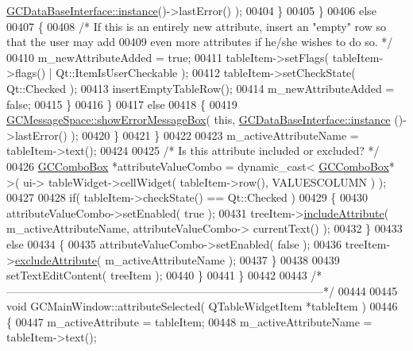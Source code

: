 \begin{DoxyCode}
{      \hyperlink{class_g_c_data_base_interface_a1baea9c0667aa8b610ec30076fcab84c}{GCDataBaseInterface::instance}()->lastError() );
00404           \}
00405         \}
00406         \textcolor{keywordflow}{else}
00407         \{
00408           \textcolor{comment}{/* If this is an entirely new attribute, insert an "empty" row so
       that the user may add}
00409 \textcolor{comment}{            even more attributes if he/she wishes to do so. */}
00410           m\_newAttributeAdded = \textcolor{keyword}{true};
00411           tableItem->setFlags( tableItem->flags() | Qt::ItemIsUserCheckable );
00412           tableItem->setCheckState( Qt::Checked );
00413           insertEmptyTableRow();
00414           m\_newAttributeAdded = \textcolor{keyword}{false};
00415         \}
00416       \}
00417       \textcolor{keywordflow}{else}
00418       \{
00419         \hyperlink{namespace_g_c_message_space_ab118b3a133686167617eb955029fd44e}{GCMessageSpace::showErrorMessageBox}( \textcolor{keyword}{this}, \hyperlink{class_g_c_data_base_interface_a1baea9c0667aa8b610ec30076fcab84c}{GCDataBaseInterface::instance}
      ()->lastError() );
00420       \}
00421     \}
00422 
00423     m\_activeAttributeName = tableItem->text();
00424 
00425     \textcolor{comment}{/* Is this attribute included or excluded? */}
00426     \hyperlink{class_g_c_combo_box}{GCComboBox} *attributeValueCombo = \textcolor{keyword}{dynamic\_cast<} \hyperlink{class_g_c_combo_box}{GCComboBox}* \textcolor{keyword}{>}( ui->
      tableWidget->cellWidget( tableItem->row(), VALUESCOLUMN ) );
00427 
00428     \textcolor{keywordflow}{if}( tableItem->checkState() == Qt::Checked )
00429     \{
00430       attributeValueCombo->setEnabled( \textcolor{keyword}{true} );
00431       treeItem->\hyperlink{class_g_c_tree_widget_item_a3f1c09758031e2a8fc1ac9336697b3d9}{includeAttribute}( m\_activeAttributeName, attributeValueCombo->
      currentText() );
00432     \}
00433     \textcolor{keywordflow}{else}
00434     \{
00435       attributeValueCombo->setEnabled( \textcolor{keyword}{false} );
00436       treeItem->\hyperlink{class_g_c_tree_widget_item_a76e60292eec635fd2e6df27a3e162e16}{excludeAttribute}( m\_activeAttributeName );
00437     \}
00438 
00439     setTextEditContent( treeItem );
00440   \}
00441 \}
00442 
00443 \textcolor{comment}{/*
      --------------------------------------------------------------------------------------*/}
00444 
00445 \textcolor{keywordtype}{void} GCMainWindow::attributeSelected( QTableWidgetItem *tableItem )
00446 \{
00447   m\_activeAttribute = tableItem;
00448   m\_activeAttributeName = tableItem->text();
}
\end{DoxyCode}
